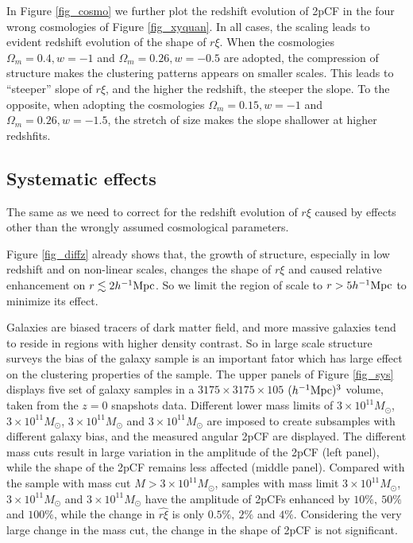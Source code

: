 \documentclass[iop]{emulateapj}
\begin{document}
In Figure \ref{fig_cosmo} we further plot the redshift evolution of 2pCF in the four wrong cosmologies of Figure \ref{fig_xyquan}.
In all cases, the scaling leads to evident redshift evolution of the shape of $r\xi$.
When the cosmologies $\Omega_m=0.4,w=-1$ and $\Omega_m=0.26,w=-0.5$ are adopted,
the compression of structure makes the clustering patterns appears on smaller scales.
This leads to ``steeper'' slope of $r\xi$, 
and the higher the redshift, the steeper the slope.
To the opposite, when adopting the cosmologies $\Omega_m=0.15,w=-1$ and $\Omega_m=0.26,w=-1.5$,
the stretch of size makes the slope shallower at higher redshfits.


\subsection{Systematic effects}

The same as \cite{Li2014,Li2015,Li2016} we need to correct for the redshift evolution of $r\xi$ caused by effects other than the wrongly assumed cosmological parameters.

Figure \ref{fig_diffz} already shows that, the growth of structure, especially in low redshift and on non-linear scales, 
changes the shape of $r\xi$ and caused relative enhancement on $r\lesssim2 h^{-1}\rm Mpc$.
So we limit the region of scale to $r>5h^{-1}\rm Mpc$ to minimize its effect.

Galaxies are biased tracers of dark matter field, 
and more massive galaxies tend to reside in regions with higher density contrast.
So in large scale structure surveys the bias of the galaxy sample is an important fator which has large effect on the clustering properties of the sample.
The upper panels of Figure \ref{fig_sys} displays five set of galaxy samples in a $3175\times3175\times105$ $(h^{-1}\rm Mpc)^3$ volume, taken from the $z=0$ snapshots data.
Different lower mass limits of $3\times 10^{11} M_{\odot}$, $3\times 10^{11} M_{\odot}$, $3\times 10^{11} M_{\odot}$ and $3\times 10^{11} M_{\odot}$
are imposed to create subsamples with different galaxy bias, 
and the measured angular 2pCF are displayed.
The different mass cuts result in large variation in the amplitude of the 2pCF (left panel),
while the shape of the 2pCF remains less affected (middle panel).
Compared with the sample with mass cut $M>3\times 10^{11} M_{\odot}$,
samples with mass limit $3\times 10^{11} M_{\odot}$, $3\times 10^{11} M_{\odot}$ and $3\times 10^{11} M_{\odot}$
have the amplitude of 2pCFs enhanced by $10\%,\ 50\%$ and $100\%$,
while the change in $\hat{r\xi}$ is only $0.5\%,\ 2\%$ and $4\%$.
Considering the very large change in the mass cut,
the change in the shape of 2pCF is not significant.
\end{document}
